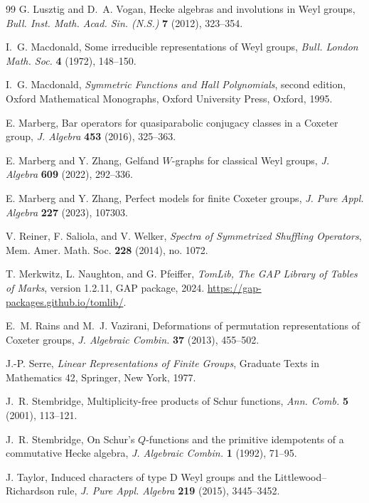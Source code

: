\documentclass[11pt]{article}
\numberwithin{equation}{section}
\theoremstyle{definition}
\begin{document}
\begin{thebibliography}{99}
G. Lusztig and D.~A. Vogan,
Hecke algebras and involutions in Weyl groups,
\emph{Bull. Inst. Math. Acad. Sin. (N.S.)} \textbf{7} (2012), 323--354.

I.~G. Macdonald,
Some irreducible representations of Weyl groups,
\emph{Bull. London Math. Soc.} \textbf{4} (1972), 148--150.

I.~G. Macdonald,
\emph{Symmetric Functions and Hall Polynomials}, second edition,
Oxford Mathematical Monographs, Oxford University Press, Oxford, 1995.

E. Marberg,
Bar operators for quasiparabolic conjugacy classes in a Coxeter group,
\emph{J. Algebra} \textbf{453} (2016), 325--363.

E. Marberg and Y. Zhang,
Gelfand \(W\)-graphs for classical Weyl groups,
\emph{J. Algebra} \textbf{609} (2022), 292--336.

E. Marberg and Y. Zhang,
Perfect models for finite Coxeter groups,
\emph{J. Pure Appl. Algebra} \textbf{227} (2023), 107303.

V. Reiner, F. Saliola, and V. Welker,
\emph{Spectra of Symmetrized Shuffling Operators},
Mem. Amer. Math. Soc. \textbf{228} (2014), no. 1072.

T. Merkwitz, L. Naughton, and G. Pfeiffer,
\emph{TomLib, The GAP Library of Tables of Marks}, version 1.2.11,
GAP package, 2024.
\url{https://gap-packages.github.io/tomlib/}.

E.~M. Rains and M.~J. Vazirani,
Deformations of permutation representations of Coxeter groups,
\emph{J. Algebraic Combin.} \textbf{37} (2013), 455--502.

J.-P. Serre,
\emph{Linear Representations of Finite Groups},
Graduate Texts in Mathematics 42, Springer, New York, 1977.

J.~R. Stembridge,
Multiplicity-free products of Schur functions,
\emph{Ann. Comb.} \textbf{5} (2001), 113--121.

J.~R. Stembridge,
On Schur's \(Q\)-functions and the primitive idempotents of a commutative Hecke algebra,
\emph{J. Algebraic Combin.} \textbf{1} (1992), 71--95.

J. Taylor,
Induced characters of type D Weyl groups and the Littlewood--Richardson rule,
\emph{J. Pure Appl. Algebra} \textbf{219} (2015), 3445--3452.


\end{thebibliography}
\end{document}
